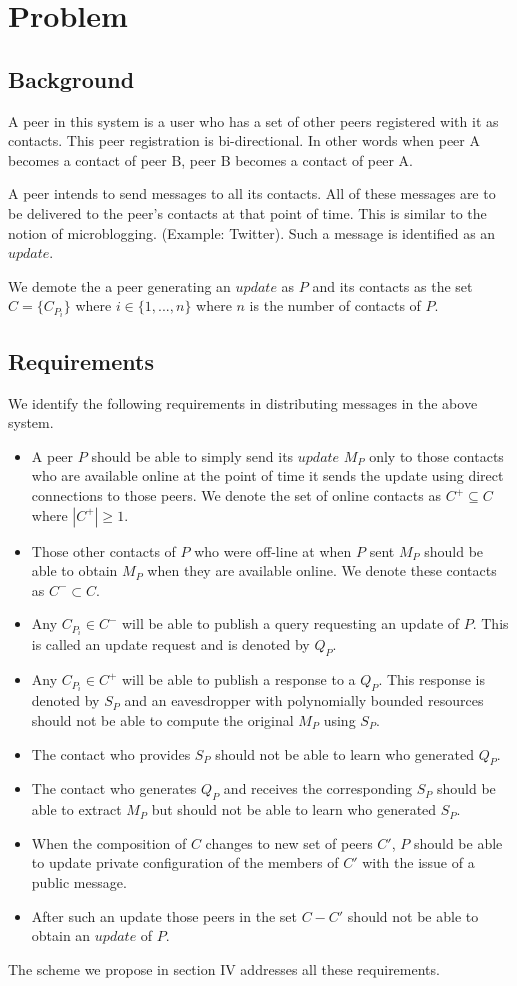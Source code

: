 \section{Problem}


\subsection{Background}
A peer in this system is a user who has a set of other peers registered with it as contacts. This peer registration is bi-directional. In other words when peer A becomes a contact of peer B, peer B becomes a contact of peer A. 

A peer intends to send messages to all its contacts. All of these messages are to be delivered to the peer's contacts at that point of time. This is similar to the notion of microblogging. (Example: Twitter\cite{twitter}). Such a message is identified as an $update$.

We demote the a peer generating an $update$ as $P$ and its contacts as the set $C = \{C_{P_i}\}$ where $i \in \{1 , ..., n\}$ where $n$ is the number of contacts of $P$.

\subsection{Requirements}
We identify the following requirements in distributing messages in the above system.
\begin{itemize}
	\item A peer $P$ should be able to simply send its $update$ $M_P$ only to those contacts who are available online at the point of time it sends the update using direct connections to those peers. We denote the set of online contacts as  ${C^+} \subseteq C$ where $|{C^+}| \geq 1$.
	\item Those other contacts of $P$ who were off-line at when $P$ sent $M_P$ should be able to obtain $M_P$ when they are available online. We denote these contacts as ${C^-} \subset C$.
	\item Any $C_{P_i} \in C^-$ will be able to publish a query requesting an update of $P$. This is called an update request and is denoted by $Q_P$.
	\item Any  $C_{P_i} \in C^+$ will be able to publish a response to a $Q_P$. This response is denoted by $S_P$ and an eavesdropper with polynomially bounded resources should not be able to compute the original $M_P$ using $S_P$.
	\item The contact who provides $S_P$ should not be able to learn who generated $Q_P$.
	\item The contact who generates $Q_P$ and receives the corresponding $S_P$ should be able to extract $M_P$ but should not be able to learn who generated $S_P$.
	\item When the composition of $C$ changes to new set of peers $C'$, $P$ should be able to update private configuration of the members of $C'$ with the issue of a public message.
	\item After such an update those peers in the set $C - C'$ should not be able to obtain an $update$ of $P$.
\end{itemize}
The scheme we propose in section IV addresses all these requirements.

